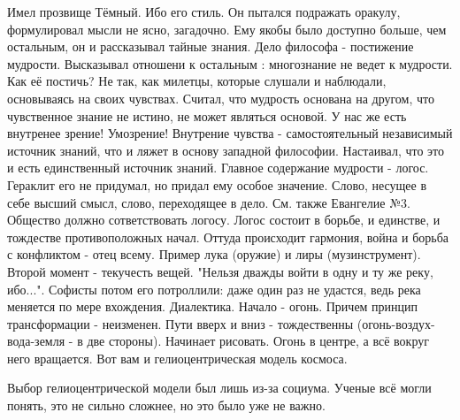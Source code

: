 Имел прозвище Тёмный. Ибо его стиль. Он пытался подражать оракулу, формулировал мысли не ясно, загадочно. Ему якобы было доступно больше, чем остальным, он и рассказывал тайные знания.
Дело философа - постижение мудрости. Высказывал отношени к остальным : многознание не ведет к мудрости. Как её постичь? Не так, как милетцы, которые слушали и наблюдали, основываясь на своих чувствах. Считал, что мудрость основана на другом, что чувственное знание не истино, не может являться основой. У нас же есть внутренее зрение! Умозрение! Внутрение чувства - самостоятельный независимый источник знаний, что и ляжет в основу западной философии. Настаивал, что это и есть единственный источник знаний.
Главное содержание мудрости - логос. Гераклит его не придумал, но придал ему особое значение. Слово, несущее в себе высший смысл, слово, переходящее в дело. См. также Евангелие №3.
Общество должно сответствовать логосу. Логос состоит в борьбе, и единстве, и тождестве противоположных начал. Оттуда происходит гармония, война и борьба с конфликтом - отец всему. Пример лука (оружие) и лиры (музинструмент). Второй момент - текучесть вещей. "Нельзя дважды войти в одну и ту же реку, ибо...". Софисты потом его потроллили: даже один раз не удастся, ведь река меняется по мере вхождения.
Диалектика.
Начало - огонь. Причем принцип трансформации - неизменен. Пути вверх и вниз - тождественны (огонь-воздух-вода-земля - в две стороны). Начинает рисовать. Огонь в центре, а всё вокруг него вращается. Вот вам и гелиоцентрическая модель космоса.

Выбор гелиоцентрической модели был лишь из-за социума. Ученые всё могли понять, это не сильно сложнее, но это было уже не важно.
